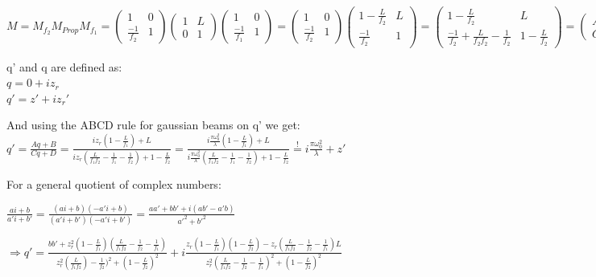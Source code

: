\documentclass{article}
\newcommand{\mbeq}{\overset{!}{=}}
\begin{document}
 $M = M_{f_2}M_{Prop}M_{f_1}=\begin{pmatrix}1 & 0\\ \frac{-1}{f_2} & 1
\end{pmatrix}\begin{pmatrix}1 & L\\ 0 & 1
\end{pmatrix}\begin{pmatrix}1 & 0\\ \frac{-1}{f_1} & 1
\end{pmatrix} =\begin{pmatrix}1 & 0\\ \frac{-1}{f_2} & 1
\end{pmatrix}\begin{pmatrix} 1-\frac{L}{f_2} & L\\ \frac{-1}{f_2} & 1
\end{pmatrix} = \begin{pmatrix} 1-\frac{L}{f_2} & L\\ \frac{-1}{f_2}+\frac{L}{f_2 f_2}-\frac{1}{f_2} & 1-\frac{L}{f_2}
\end{pmatrix}
 = \begin{pmatrix} A&B\\C&D\end{pmatrix}$

\setlength{\parskip}{2em}

q' and q are defined as:\\
$q=0+iz_r$\\
${q}'={z}'+i{z_r}'$

And using the ABCD rule for gaussian beams on q' we get:\\ 
${q}'=\frac{Aq+B}{Cq+D}=\frac{iz_r(1-\frac{L}{f_1})+L}{iz_r(\frac{L}{f_1 f_2}-\frac{1}{f_1}-\frac{1}{f_2})+1-\frac{L}{f_2}}=\frac{i\frac{\pi\omega_0^2}{\lambda}(1-\frac{L}{f_1})+L}{i\frac{\pi\omega_0^2}{\lambda}(\frac{L}{f_1 f_2}-\frac{1}{f_1}-\frac{1}{f_2})+1-\frac{L}{f_2}}\mbeq i\frac{\pi\omega_0^2}{\lambda}+{z}'$ 


For a general quotient of complex numbers:

$\frac{ai+b}{{a}'i+{b}'}=\frac{(ai+b)(-{a}'i+b)}{({a}'i+{b}')(-{a}'i+{b}')}=\frac{a{a}'+b{b}'+i(a{b}'-{a}'b)}{{a}'^2+{b}'^2}
$

$\Rightarrow{} {q}' = \frac{b{b}'+z_r^2(1-\frac{L}{f_1})(\frac{L}{f_1 f_2}-\frac{1}{f_2}-\frac{1}{f_1})}{z_r^2(\frac{L}{f_1 f_2})-\frac{1}{f_2})^2+(1-\frac{L}{f_2})^2}+i\frac{z_r(1-\frac{L}{f_1})(1-\frac{L}{f_2})-z_r(\frac{L}{f_1 f_2}-\frac{1}{f_2}-\frac{1}{f_1})L}{z_r^2(\frac{L}{f_1 f_2}-\frac{1}{f_2}-\frac{1}{f_1})^2+(1-\frac{L}{f_2})^2}
$
\end{document}
